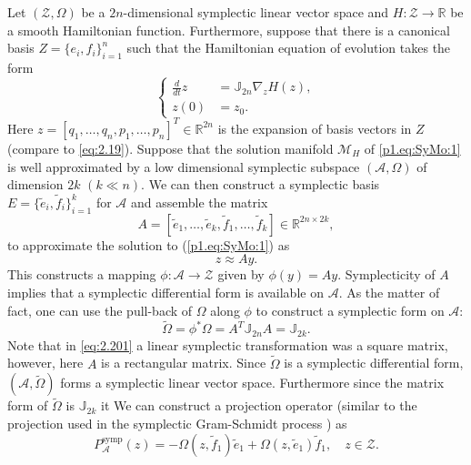 Let $(\mathcal Z,\Omega)$ be a $2n$-dimensional symplectic linear vector space and $H: \mathcal Z \to \mathbb R$ be a smooth Hamiltonian function. Furthermore, suppose that there is a canonical basis $Z = \{e_i,f_i\}_{i=1}^n$ such that the Hamiltonian equation of evolution takes the form
\begin{equation} \label{p1.eq:SyMo:1}
	\left\{
	\begin{aligned}
		\frac d {dt} z &= \mathbb J_{2n} \nabla_z H(z), \\
		z(0) &= z_0.
	\end{aligned}
	\right.
\end{equation}
Here $z = [q_1,\dots,q_n,p_1,\dots,p_n]^T\in \mathbb R^{2n}$ is the expansion of basis vectors in $Z$ (compare to \cref{eq:2.19}). Suppose that the solution manifold $\mathcal M_H$ of \cref{p1.eq:SyMo:1} is well approximated by a low dimensional symplectic subspace $(\mathcal A,\Omega)$ of dimension $2k$ $(k\ll n)$. We can then construct a symplectic basis $E=\{ \tilde e_i,\tilde f_i \}_{i=1}^k$ for $\mathcal A$ and assemble the matrix
\begin{equation} \label{p1.eq:SyMo:1.1}
	A = [\tilde e_1,\dots,\tilde e_k,\tilde f_1,\dots,\tilde f_k]\in \mathbb R^{2n\times 2k},
\end{equation} \label{p1.eq:SyMo:1.2}
to approximate the solution to (\ref{p1.eq:SyMo:1}) as
\begin{equation} \label{eq:SyMo:1.2}
	z \approx A y.
\end{equation}
This constructs a mapping $\phi:\mathcal A \to \mathcal Z$ given by $\phi(y) = Ay$. Symplecticity of $A$ implies that a symplectic differential form is available on $\mathcal A$. As the matter of fact, one can use the pull-back of $\Omega$ along $\phi$ to construct a symplectic form on $\mathcal A$:
\begin{equation} \label{p1.eq:SyMo:1.3}
	\tilde \Omega = \phi^*\Omega = A^T \mathbb J_{2n} A = \mathbb J_{2k}.
\end{equation}
Note that in \cref{eq:2.201} a linear symplectic transformation was a square matrix, however, here $A$ is a rectangular matrix. Since $\tilde \Omega$ is a symplectic differential form, $(\mathcal A, \tilde \Omega)$ forms a symplectic linear vector space. Furthermore since the matrix form of $\tilde \Omega$ is $\mathbb J_{2k}$ it We can construct a projection operator (similar to the projection used in the symplectic Gram-Schmidt process ) as
\begin{equation} \label{p1.eq:SyMo:1.4}
	P^{\text{symp}}_{\mathcal A}(z) = -\Omega(z,\tilde f_1)\tilde e_1 + \Omega(z,\tilde e_1) \tilde f_1, \quad z\in \mathcal Z.
\end{equation}

